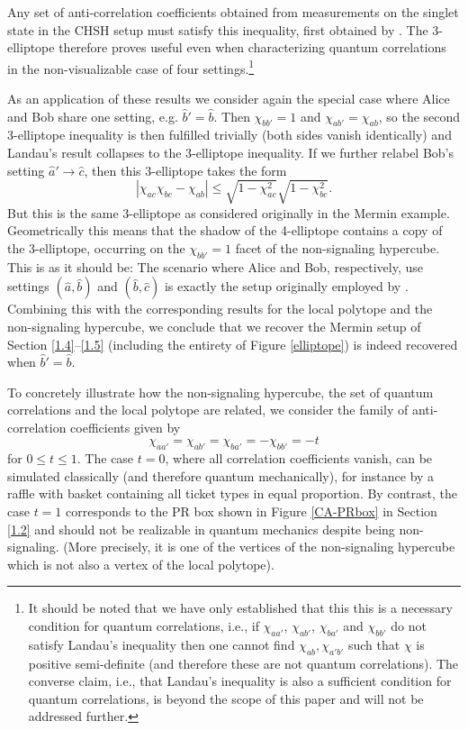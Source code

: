 Any set of anti-correlation coefficients obtained from measurements on the singlet state in the CHSH setup must satisfy this inequality, first obtained by \citet{Landau 1988}. The 3-elliptope therefore proves useful even when characterizing quantum correlations in the non-visualizable case of four settings.\footnote{It should be noted that we have only established that this this is a necessary condition for quantum correlations, i.e., if $\chi_{aa'}$, $\chi_{ab'}$, $\chi_{ba'}$ and $\chi_{bb'}$ do not satisfy Landau's inequality then one cannot find $\chi_{ab},\chi_{a'b'}$ such that $\chi$ is positive semi-definite (and therefore these are not quantum correlations). The converse claim, i.e., that Landau's inequality  is also a sufficient condition for quantum correlations, is beyond the scope of this paper and will not be addressed further.}

As an application of these results we consider again the special case where Alice and Bob share one setting, e.g. $\hat{b}'=\hat{b}$. Then $\chi_{bb'}=1$ and $\chi_{ab'}=\chi_{ab}$, so the second 3-elliptope inequality is then fulfilled trivially (both sides vanish identically) and Landau's result collapses to the 3-elliptope inequality. If we further relabel Bob's setting $\hat{a}'\to\hat{c}$, then this 3-elliptope takes the form
\begin{equation}
 |\chi_{ac}\chi_{bc}-\chi_{ab}| \leq \sqrt{1-\chi_{ac}^2}\sqrt{1-\chi_{bc}^2}.
\end{equation}
But this is the same 3-elliptope as considered originally in the Mermin example. Geometrically this means that the shadow of the 4-elliptope contains a copy of the 3-elliptope, occurring on the $\chi_{bb'}=1$ facet of the non-signaling hypercube.  This is as it should be:  The scenario where Alice and Bob, respectively, use settings $(\hat{a},\hat{b})$ and $(\hat{b},\hat{c})$ is exactly the setup originally employed by \citet{Bell 1964}. Combining this with the corresponding results for the local polytope and the non-signaling hypercube, we conclude that we recover the Mermin setup of Section \ref{1.4}--\ref{1.5} (including the entirety of Figure \ref{elliptope}) is indeed recovered when $\hat{b}'=\hat{b}$.

To concretely illustrate how the non-signaling hypercube, the set of quantum correlations and the local polytope are related, we consider the family of anti-correlation coefficients given by 
\begin{equation}
\chi_{aa'}=\chi_{ab'}=\chi_{ba'}=-\chi_{bb'}=-t
\end{equation}
for $0\leq t\leq 1$. The case $t=0$, where all correlation coefficients vanish, can be simulated classically (and therefore quantum mechanically), for instance by a raffle with basket containing all ticket types in equal proportion. By contrast, the case $t=1$ corresponds to the PR box shown in Figure \ref{CA-PRbox} in Section \ref{1.2} and should not be realizable in quantum mechanics despite being non-signaling. (More precisely, it is one of the vertices of the non-signaling hypercube which is not also a vertex of the local polytope).

